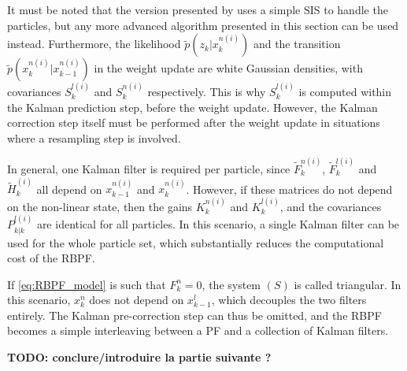 \begin{algorithm}[H]
	\begin{algorithmic}
	\end{algorithmic}\caption{Rao-Blackwellised Particle Filter}\label{alg:RBPF}
\end{algorithm}

It must be noted that the version presented by  uses a simple SIS to handle the particles, but any more advanced algorithm presented in this section can be used instead. Furthermore, the likelihood $\tilde{p}\left(z_k|x_k^{n(i)}\right)$ and the transition $\tilde{p}\left(x_k^{n(i)}|x_{k-1}^{n(i)}\right)$ in the weight update are white Gaussian densities, with covariances $S_k^{l(i)}$ and $S_k^{n(i)}$ respectively. This is why $S_k^{l(i)}$ is computed within the Kalman prediction step, before the weight update. However, the Kalman correction step itself must be performed after the weight update in situations where a resampling step is involved.

\begin{remark}
	In general, one Kalman filter is required per particle, since $\tilde{F}_k^{n(i)}$, $\tilde{F}_k^{l(i)}$ and $\tilde{H}_k^{(i)}$ all depend on $x_{k-1}^{n(i)}$ and $x_k^{n(i)}$. However, if these matrices do not depend on the non-linear state, then the gains $K_k^{n(i)}$ and $K_k^{l(i)}$, and the covariances $P_{k|k}^{l(i)}$ are identical for all particles. In this scenario, a single Kalman filter can be used for the whole particle set, which substantially reduces the computational cost of the RBPF.
\end{remark}

\begin{remark}
	If \eqref{eq:RBPF_model} is such that $F_k^n=0$, the system $(S)$ is called triangular. In this scenario, $x_k^n$ does not depend on $x_{k-1}^l$, which decouples the two filters entirely. The Kalman pre-correction step can thus be omitted, and the RBPF becomes a simple interleaving between a PF and a collection of Kalman filters.
\end{remark}

\textbf{TODO: conclure/introduire la partie suivante ?}
